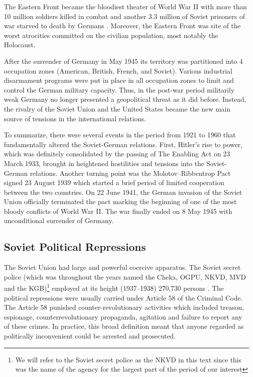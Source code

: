 The Eastern Front became the bloodiest theater of World War II with more than 10 million soldiers killed in combat and another 3.3 million of Soviet prisoners of war starved to death  by Germans \citep[p. 155]{snyder_bloodlands:_2011}. Moreover, the Eastern Front was site of the worst atrocities committed on the civilian population, most notably the Holocaust. 

After the surrender of Germany in May 1945 its territory was partitioned into 4 occupation zones (American, British, French, and Soviet).  Various industrial disarmament programs were put in place in all occupation zones to limit and control the German military capacity. Thus, in the post-war period militarily weak Germany no longer presented a geopolitical threat as it did before.
Instead,  the rivalry  of the Soviet Union and the United States became  the new main source of tensions in the international relations. 

To summarize, there were several events in the period from 1921 to 1960 that fundamentally  altered the Soviet-German relations. First,  Hitler's rise to power, which was definitely consolidated by the passing of The Enabling Act on 23 March 1933, brought in heightened hostilities and tensions into the Soviet-German relations.
Another turning point was the Molotov–Ribbentrop Pact signed 23 August 1939 which started a brief period of limited cooperation between the two countries. 
On 22 June 1941, the German invasion of the Soviet Union officially terminated the pact  marking the beginning of one of the most bloody conflicts of World War II. 
 The war finally ended on  8 May 1945  with unconditional surrender of Germany. 
\subsection{Soviet Political Repressions}
The Soviet Union had large and powerful coercive apparatus. The Soviet secret police (which was throughout the years named the Cheka, OGPU, NKVD, MVD and  the KGB)\footnote{We will refer to the Soviet secret police as the NKVD in this text since this was the name of the agency for the largest part of the period of our interest} employed at its height (1937–1938)  270,730 persons \citep[p. 2]{gregory_terror_2009}. 
The political repressions were usually carried under Article 58 of the Criminal Code. The Article 58 punished counter-revolutionary activities 
which included treason, espionage, counterrevolutionary propaganda, agitation and  failure to report any of these crimes.  
In practice, this broad definition meant that anyone regarded as politically inconvenient could be arrested and prosecuted. 

